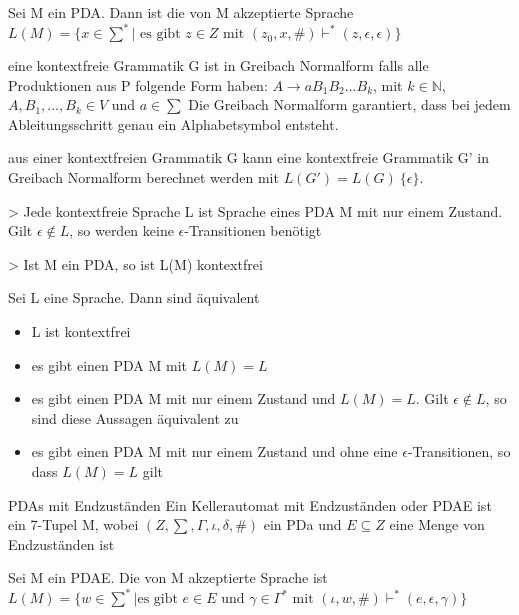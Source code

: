 \documentclass[avery5371]{flashcards}
\begin{document}
\begin{flashcard}[Definition]{ Sei M ein PDA. Dann ist die von M akzeptierte Sprache}
     $L(M)=\{x\in\sum^* | \text{ es gibt } z\in Z \text{ mit } (z_0,x,\#)\vdash^* (z,\epsilon,\epsilon)\}$
    \end{flashcard}

\begin{flashcard}[Definition]{ eine kontextfreie Grammatik G ist in Greibach Normalform} falls alle Produktionen aus P folgende Form haben: $A\rightarrow aB_1B_2...B_k$, mit $k\in \mathbb{N}$, $A,B_1,...,B_k\in V$ und $a\in \sum$
Die Greibach Normalform garantiert, dass bei jedem Ableitungsschritt genau ein Alphabetsymbol entsteht.
\end{flashcard}

\begin{flashcard}[Satz]{ aus einer kontextfreien Grammatik G kann eine kontextfreie Grammatik G' in Greibach Normalform berechnet werden mit}
     $L(G')=L(G)\ \{\epsilon\}$.

> Jede kontextfreie Sprache L ist Sprache eines PDA M mit nur einem Zustand. Gilt $\epsilon\not\in L$, so werden keine $\epsilon$-Transitionen benötigt

> Ist M ein PDA, so ist L(M) kontextfrei
\end{flashcard}

\begin{flashcard}[Satz]{ Sei L eine Sprache. Dann sind äquivalent}\begin{itemize}
\item L ist kontextfrei
\item es gibt einen PDA M mit $L(M)=L$
\item es gibt einen PDA M mit nur einem Zustand und $L(M)=L$. Gilt $\epsilon\not\in L$, so sind diese Aussagen äquivalent zu
\item es gibt einen PDA M mit nur einem Zustand und ohne eine $\epsilon$-Transitionen, so dass $L(M)=L$ gilt
\end{itemize}
\end{flashcard}

\begin{flashcard}[Definition]{PDAs mit Endzuständen} Ein Kellerautomat mit Endzuständen oder PDAE ist ein 7-Tupel M, wobei $(Z,\sum,\Gamma, \iota, \delta, \#)$ ein PDa und $E\subseteq Z$ eine Menge von Endzuständen ist
\end{flashcard}

\begin{flashcard}[Definition]{ Sei M ein PDAE. Die von M akzeptierte Sprache ist} $L(M)=\{w\in\sum^* | \text{es gibt } e\in E \text{ und } \gamma\in\Gamma^* \text{ mit } (\iota, w,\#)\vdash^* (e,\epsilon,\gamma)\}$
\end{flashcard}
\end{document}
